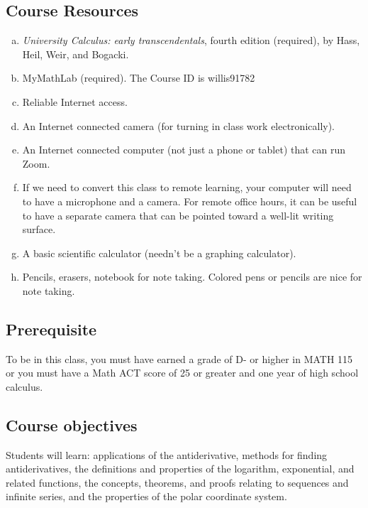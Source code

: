 \documentclass[12pt]{article}
\newcounter{ex}\setcounter{ex}{0}
\newenvironment{alphalist}{
  \begin{enumerate}[(a)]
    \addtolength{\itemsep}{-0.5\itemsep}}
  {\end{enumerate}}
\begin{document}
\newpage

\subsection*{Course Resources}

\begin{alphalist}

\item \emph{University Calculus: early transcendentals}, fourth edition (required), by Hass,  Heil, Weir, and Bogacki.

\item MyMathLab (required).  The Course ID is willis91782 

\item Reliable Internet access.

\item An Internet connected camera (for turning in class work electronically).

\item  An Internet connected computer (not just a phone or tablet) that can run Zoom. 

\item If we need to convert this class to remote learning, your computer will need to have a microphone and a camera. For remote office hours, it can be useful to have a separate camera that can be pointed toward a well-lit writing surface.

\item A basic scientific calculator (needn't be a graphing calculator).

\item Pencils, erasers, notebook for note taking. Colored pens or pencils are nice for note taking.

\end{alphalist}
\subsection*{Prerequisite}

To be in this class, you must have earned a grade of D- or higher in 
MATH 115 or you must have a Math ACT score of 25 or greater and 
one year of high school calculus.

\subsection*{Course objectives}

Students will learn: applications of the antiderivative, methods for finding antiderivatives, the definitions and properties of the logarithm, exponential, and related functions,
the concepts, theorems, and proofs relating to sequences and infinite series, and the properties of the polar coordinate system.
\end{document}
